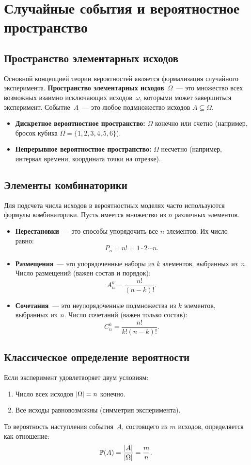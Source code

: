 \section{Случайные события и вероятностное пространство}

\subsection{Пространство элементарных исходов}
Основной концепцией теории вероятностей является формализация случайного эксперимента.
\textbf{Пространство элементарных исходов}~$\Omega$~--- это множество всех возможных взаимно исключающих исходов~$\omega$, которыми может завершиться эксперимент.
Событие~$A$~--- это любое подмножество исходов $A \subseteq \Omega$.

\begin{itemize}
\item \textbf{Дискретное вероятностное пространство:} $\Omega$ конечно или счетно (например, бросок кубика $\Omega = \{1, 2, 3, 4, 5, 6\}$).
\item \textbf{Непрерывное вероятностное пространство:} $\Omega$ несчетно (например, интервал времени, координата точки на отрезке).
\end{itemize}

\subsection{Элементы комбинаторики}
Для подсчета числа исходов в вероятностных моделях часто используются формулы комбинаторики. Пусть имеется множество из $n$ различных элементов.
\begin{itemize}
\item \textbf{Перестановки}~--- это способы упорядочить все $n$ элементов. Их число равно:
\[
P_n = n! = 1 \cdot 2 \dotsm n.
\]
\item \textbf{Размещения}~--- это упорядоченные наборы из $k$ элементов, выбранных из~$n$. Число размещений (важен состав и порядок):
\[
A_n^k = \frac{n!}{(n-k)!}.
\]
\item \textbf{Сочетания}~--- это неупорядоченные подмножества из $k$ элементов, выбранных из~$n$. Число сочетаний (важен только состав):
\[
C_n^k = \frac{n!}{k!(n-k)!}.
\]
\end{itemize}

\subsection{Классическое определение вероятности}
Если эксперимент удовлетворяет двум условиям:
\begin{enumerate}
\item Число всех исходов $\lvert\Omega\rvert = n$ конечно.
\item Все исходы равновозможны (симметрия эксперимента).
\end{enumerate}
То вероятность наступления события~$A$, состоящего из $m$ исходов, определяется как отношение:
\[
\mathbb{P}(A) = \frac{\lvert A\rvert}{\lvert\Omega\rvert} = \frac{m}{n}.
\]

